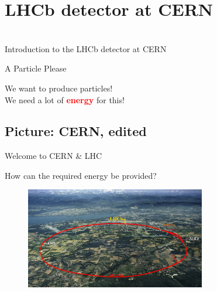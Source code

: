    \section{LHCb detector at CERN}
\begin{frame}[plain]

\begin{center} 
  \huge{   }\\
   \Large{ Introduction to the LHCb detector at CERN}

\end{center}
\end{frame}


\begin{frame}{A Particle Please}

    \begin{center}
   \Large We want to produce particles!\\
    
    \Large We need a lot of \textbf{\textcolor{red}{energy}} for this!
        
    \end{center}
    
\end{frame}
\subsection{Picture: CERN, edited}
\begin{frame}{Welcome to CERN \& LHC}

  \begin{center}
   \Large How can the required energy be provided?
    \end{center}
    
    \begin{figure}[h]
        \centering
        \includegraphics[width=0.7\textwidth]{Figures Introductory Lecture/LHCb Detector/LHC.jpg}
        \label{fig:CERN_LHC}
    \end{figure}
\end{frame}

